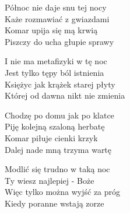\begin{text}
    Północ nie daje snu tej nocy\\
    Każe rozmawiać z gwiazdami\\
    Komar upija się mą krwią\\
    Piszczy do ucha głupie sprawy

    I nie ma metafizyki w tę noc\\
    Jest tylko tępy ból istnienia\\
    Księżyc jak krążek starej płyty\\
    Której od dawna nikt nie zmienia

    Chodzę po domu jak po klatce\\
    Piję kolejną szaloną herbatę\\
    Komar piłuje cienki krzyk\\
    Dalej nade mną trzyma wartę

    Modlić się trudno w taką noc\\
    Ty wiesz najlepiej - Boże\\
    Więc tylko można wyjść za próg\\
    Kiedy poranne wstają zorze
\end{text}
\begin{chord}

\end{chord}